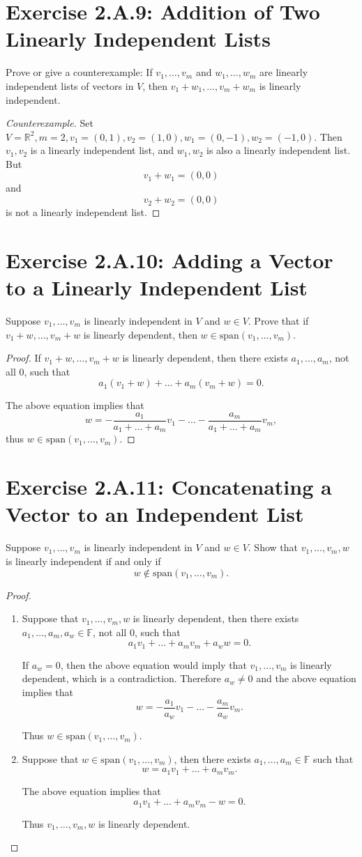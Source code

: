 \section{Exercise 2.A.9: Addition of Two Linearly Independent Lists}
Prove or give a counterexample: If $v_1,\dots,v_m$ and $w_1,\dots,w_m$ are linearly independent lists of vectors in $V$, then $v_1+w_1,\dots,v_m+w_m$ is linearly independent.
\begin{proof}[Counterexample]
Set $V=\mathbb{R}^2, m=2, v_1=(0,1), v_2=(1,0), w_1=(0,-1), w_2=(-1,0)$. Then $v_1, v_2$ is a linearly independent list, and $w_1, w_2$ is also a linearly independent list. But\[
v_1+w_1=(0,0)
\] and \[
v_2+w_2=(0,0)
\] is not a linearly independent list.
\end{proof}

\section{Exercise 2.A.10: Adding a Vector to a Linearly Independent List}
Suppose $v_1,\dots,v_m$ is linearly independent in $V$ and $w\in V$. Prove that if $v_1+w,\dots,v_m+w$ is linearly dependent, then $w\in \text{span}(v_1,\dots,v_m)$.
\begin{proof}
If $v_1+w,\dots,v_m+w$ is linearly dependent, then there exists $a_1,\dots,a_m$, not all $0$, such that\[
a_1(v_1+w)+\dots+a_m(v_m+w)=0.
\]

The above equation implies that\[
w=-\frac{a_1}{a_1+\dots+a_m}v_1-\dots-\frac{a_m}{a_1+\dots+a_m}v_m,
\]
thus $w\in\text{span}(v_1,\dots,v_m)$.
\end{proof}

\section{Exercise 2.A.11: Concatenating a Vector to an Independent List}
Suppose $v_1,\dots,v_m$ is linearly independent in $V$ and $w\in V$. Show that $v_1,\dots,v_m,w$ is linearly independent if and only if\[
w\notin \text{span}(v_1,\dots,v_m).
\]
\begin{proof}
\begin{enumerate}
\item Suppose that $v_1,\dots,v_m,w$ is linearly dependent, then there exists $a_1,\dots,a_m,a_w\in\mathbb{F}$, not all $0$, such that\[
a_1v_1+\dots+a_mv_m+a_ww=0.
\]

If $a_w=0$, then the above equation would imply that $v_1,\dots,v_m$ is linearly dependent, which is a contradiction. Therefore $a_w\ne 0$ and the above equation implies that\[
w=-\frac{a_1}{a_w}v_1-\dots-\frac{a_m}{a_w}v_m.
\]

Thus $w\in \text{span}(v_1,\dots,v_m)$.
\item Suppose that $w\in \text{span}(v_1,\dots,v_m)$, then there exists $a_1,\dots,a_m\in\mathbb{F}$ such that\[
w=a_1v_1+\dots+a_mv_m.
\]

The above equation implies that\[
a_1v_1+\dots+a_mv_m-w=0.
\]

Thus $v_1,\dots,v_m,w$ is linearly dependent.
\end{enumerate}
\end{proof}

